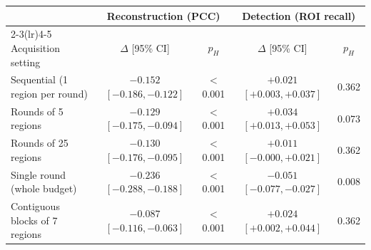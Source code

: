 \begin{tabular}{lcccc}
\toprule
 & \multicolumn{2}{c}{Reconstruction (PCC)} & \multicolumn{2}{c}{Detection (ROI recall)} \\
\cmidrule(lr){2-3}\cmidrule(lr){4-5}
Acquisition setting & $\Delta$ [95\% CI] & $p_H$ & $\Delta$ [95\% CI] & $p_H$ \\
\midrule
Sequential (1 region per round) & $-0.152$ $[-0.186, -0.122]$ & $<$0.001 & ${+}0.021$ $[{+}0.003, {+}0.037]$ & 0.362 \\
Rounds of 5 regions & $-0.129$ $[-0.175, -0.094]$ & $<$0.001 & ${+}0.034$ $[{+}0.013, {+}0.053]$ & 0.073 \\
Rounds of 25 regions & $-0.130$ $[-0.176, -0.095]$ & $<$0.001 & ${+}0.011$ $[-0.000, {+}0.021]$ & 0.362 \\
Single round (whole budget) & $-0.236$ $[-0.288, -0.188]$ & $<$0.001 & $-0.051$ $[-0.077, -0.027]$ & 0.008 \\
Contiguous blocks of 7 regions & $-0.087$ $[-0.116, -0.063]$ & $<$0.001 & ${+}0.024$ $[{+}0.002, {+}0.044]$ & 0.362 \\
\bottomrule
\end{tabular}